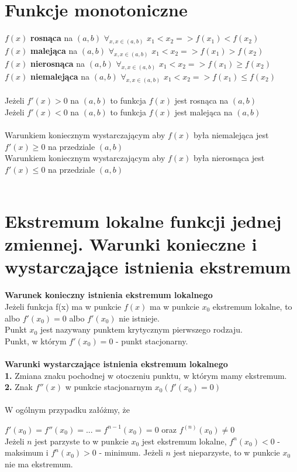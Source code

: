 \documentclass[10pt]{article}
\begin{document}
\section{Funkcje monotoniczne}
    $f(x)$ \textbf{rosnąca} na $(a, b)$  $\forall_{x,x \in (a,b)} $ $x_1<x_2 => f(x_1)< f(x_2)$ \\
    $f(x)$ \textbf{malejąca} na $(a, b)$ $\forall_{x,x \in (a,b)} $ $x_1<x_2 => f(x_1)> f(x_2)$ \\
    $f(x)$ \textbf{nierosnąca} na $(a, b)$  $\forall_{x,x \in (a,b)} $ $x_1<x_2 => f(x_1) \geq f(x_2)$ \\
    $f(x)$ \textbf{niemalejąca} na $(a, b)$  $\forall_{x,x \in (a,b)} $ $x_1<x_2 => f(x_1) \leq f(x_2)$ \\ \\
    Jeżeli $f'(x)>0$ na $(a, b)$ to funkcja $f(x)$ jest rosnąca na $(a,b)$ \\
    Jeżeli $f'(x)<0$ na $(a, b)$ to funkcja $f(x)$ jest malejąca na $(a,b)$ \\ \\
    Warunkiem koniecznym wystarczającym aby $f(x)$ była niemalejąca jest $f'(x) \geq 0$ na przedziale $(a,b)$\\
    Warunkiem koniecznym wystarczającym aby $f(x)$ była nierosnąca jest $f'(x) \leq 0$ na przedziale $(a,b)$\\ \\
\section{Ekstremum lokalne funkcji jednej zmiennej. Warunki konieczne i wystarczające istnienia ekstremum}
    \textbf{Warunek konieczny istnienia ekstremum lokalnego} \\
    Jeżeli funkcja f(x) ma w punkcie $f(x)$ ma w punkcie $x_0$ ekstremum lokalne, to albo $f'(x_0)=0$ albo $f'(x_0)$ nie istnieje. \\
    Punkt $x_0$ jest nazywany punktem krytycznym pierwszego rodzaju. \\
    Punkt, w którym $f'(x_0)=0$ - punkt stacjonarny.  \\ \\
    \textbf{Warunki wystarczające istnienia ekstremum lokalnego}\\
    \textbf{1.} Zmiana znaku pochodnej w otoczeniu punktu, w którym mamy ekstremum. \\
    \textbf{2.} Znak $f''(x)$ w punkcie stacjonarnym $x_0 (f'(x_0)=0)$ \\ \\
    W ogólnym przypadku załóżmy, że \par
    $f'(x_0)=f''(x_0)=...=f^{n-1}(x_0)=0$ oraz $f^{(n)}(x_0) \neq 0$ \\
    Jeżeli $n$ jest parzyste to w punkcie $x_0$ jest ekstremum lokalne, $f^n(x_0)<0$ - maksimum i $f^n(x_0)>0$ - minimum.
    Jeżeli $n$ jest nieparzyste, to w punkcie $x_0$ nie ma ekstremum.
\end{document}
